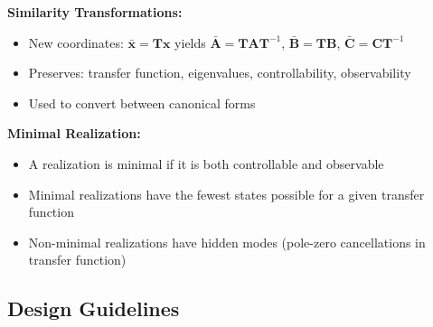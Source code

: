 \textbf{Similarity Transformations:}
\begin{itemize}
    \item New coordinates: $\bar{\mathbf{x}} = \mathbf{T}\mathbf{x}$ yields $\bar{\mathbf{A}} = \mathbf{T}\mathbf{A}\mathbf{T}^{-1}$, $\bar{\mathbf{B}} = \mathbf{T}\mathbf{B}$, $\bar{\mathbf{C}} = \mathbf{C}\mathbf{T}^{-1}$
    \item Preserves: transfer function, eigenvalues, controllability, observability
    \item Used to convert between canonical forms
\end{itemize}

\textbf{Minimal Realization:}
\begin{itemize}
    \item A realization is minimal if it is both controllable and observable
    \item Minimal realizations have the fewest states possible for a given transfer function
    \item Non-minimal realizations have hidden modes (pole-zero cancellations in transfer function)
\end{itemize}

\subsection{Design Guidelines}

